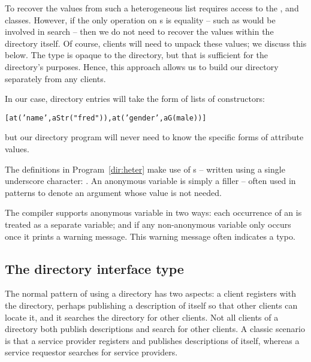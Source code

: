 To recover the values from such a heterogeneous list requires access to the ,  and  classes. However, if the only operation on s is equality -- such as would be involved in search -- then we do not need to recover the values within the directory itself. Of course, clients will need to unpack these values; we discuss this below. The  type is opaque to the directory, but that is sufficient for the directory's purposes. Hence, this approach allows us to build our directory separately from any clients.

In our case, directory entries will take the form of lists of  constructors:
\begin{alltt}
[at('name',aStr("fred")), at('gender',aG(male))]
\end{alltt}
but our directory program will never need to know the specific forms of attribute values.

\begin{aside}
The definitions in Program~\vref{dir:heter} make use of s -- written using a single underscore character: \q{\_}. An anonymous variable is simply a filler -- often used in patterns to denote an argument whose value is not needed.

The \go compiler supports anonymous variable in two ways: each occurrence of an \q{\_} is treated as a separate variable; and if any non-anonymous variable only occurs once it prints a warning message. This warning message often indicates a typo.
\end{aside}

\subsection{The directory interface type}
\label{directory:type}
The normal pattern of using a directory has two aspects: a client registers with the directory, perhaps publishing a description of itself so that other clients can locate it, and it searches the directory for other clients. Not all clients of a directory both publish descriptions and search for other clients. A classic scenario is that a service provider registers and publishes descriptions of itself, whereas a service requestor searches for service providers.

